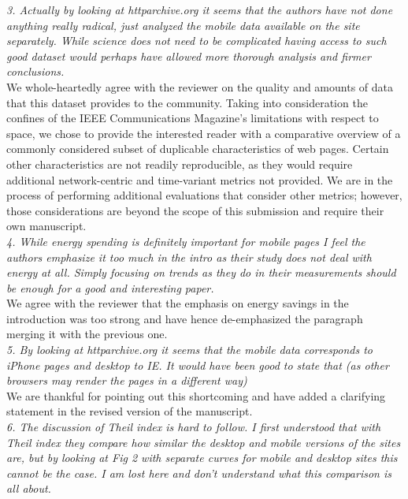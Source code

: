 \documentclass[11pt, draftclsnofoot, onecolumn]{IEEEtran}
\begin{document}
{{\noindent \textit{3. Actually by looking at httparchive.org it seems that the authors have not done anything really radical, just analyzed the mobile data available on the site separately. While science does not need to be complicated having access to such good dataset would perhaps have allowed more thorough analysis and firmer conclusions.}\\
We whole-heartedly agree with the reviewer on the quality and amounts of data that this dataset provides to the community. 
Taking into consideration the confines of the IEEE Communications Magazine's limitations with respect to space, we chose to provide the interested reader with a comparative overview of a commonly considered subset of duplicable characteristics of web pages.
Certain other characteristics are not readily reproducible, as they would require additional network-centric and time-variant metrics not provided.
We are in the process of performing additional evaluations that consider other metrics; however, those considerations are beyond the scope of this submission and require their own manuscript.\\


\noindent \textit{4. While energy spending is definitely important for mobile pages I feel the authors emphasize it too much in the intro as their study does not deal with energy at all. Simply focusing on trends as they do in their measurements should be enough for a good and interesting paper. }\\
We agree with the reviewer that the emphasis on energy savings in the introduction was too strong and have hence de-emphasized the paragraph merging it with the previous one.\\

\noindent \textit{5. By looking at httparchive.org it seems that the mobile data corresponds to iPhone pages and desktop to IE. It would have been good to state that (as other browsers may render the pages in a different way)}\\
We are thankful for pointing out this shortcoming and have added a clarifying statement in the revised version of the manuscript.\\


\noindent \textit{6. The discussion of Theil index is hard to follow. I first understood that with Theil index they compare how similar the desktop and mobile versions of the sites are, but by looking at Fig 2 with separate curves for mobile and desktop sites this cannot be the case. I am lost here and don't understand what this comparison is all about.}\\


}}
\end{document}
